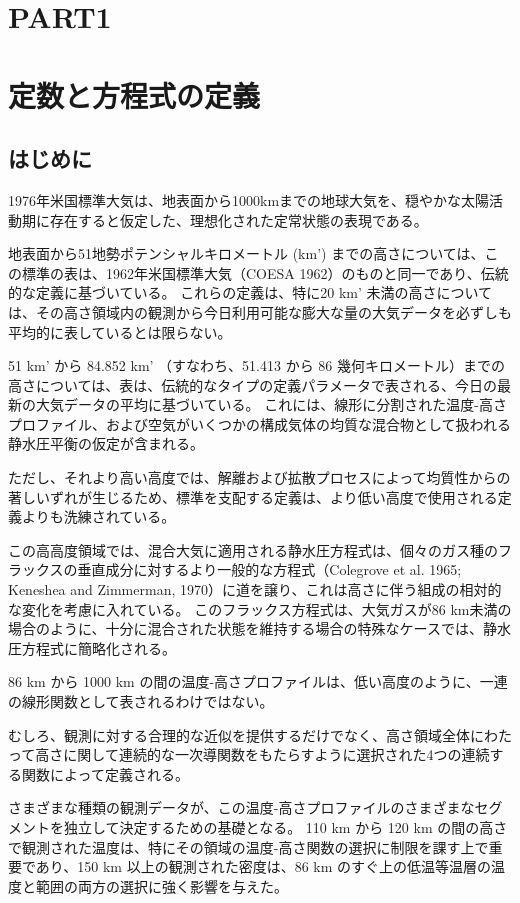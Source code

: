\documentclass{article}
\begin{document}
\begin{center}
  \section*{PART1}
  \section*{定数と方程式の定義}
\end{center}
\setcounter{section}{1}
\setcounter{subsection}{-1}
\subsection{はじめに}
1976年米国標準大気は、地表面から1000kmまでの地球大気を、穏やかな太陽活動期に存在すると仮定した、理想化された定常状態の表現である。

地表面から51地勢ポテンシャルキロメートル (km') までの高さについては、この標準の表は、1962年米国標準大気（COESA 1962）のものと同一であり、伝統的な定義に基づいている。
これらの定義は、特に20 km' 未満の高さについては、その高さ領域内の観測から今日利用可能な膨大な量の大気データを必ずしも平均的に表しているとは限らない。

51 km' から 84.852 km' （すなわち、51.413 から 86 幾何キロメートル）までの高さについては、表は、伝統的なタイプの定義パラメータで表される、今日の最新の大気データの平均に基づいている。
これには、線形に分割された温度-高さプロファイル、および空気がいくつかの構成気体の均質な混合物として扱われる静水圧平衡の仮定が含まれる。

ただし、それより高い高度では、解離および拡散プロセスによって均質性からの著しいずれが生じるため、標準を支配する定義は、より低い高度で使用される定義よりも洗練されている。

この高高度領域では、混合大気に適用される静水圧方程式は、個々のガス種のフラックスの垂直成分に対するより一般的な方程式（Colegrove et al. 1965; Keneshea and Zimmerman, 1970）に道を譲り、これは高さに伴う組成の相対的な変化を考慮に入れている。
このフラックス方程式は、大気ガスが86 km未満の場合のように、十分に混合された状態を維持する場合の特殊なケースでは、静水圧方程式に簡略化される。

86 km から 1000 km の間の温度-高さプロファイルは、低い高度のように、一連の線形関数として表されるわけではない。

むしろ、観測に対する合理的な近似を提供するだけでなく、高さ領域全体にわたって高さに関して連続的な一次導関数をもたらすように選択された4つの連続する関数によって定義される。

さまざまな種類の観測データが、この温度-高さプロファイルのさまざまなセグメントを独立して決定するための基礎となる。
110 km から 120 km の間の高さで観測された温度は、特にその領域の温度-高さ関数の選択に制限を課す上で重要であり、150 km 以上の観測された密度は、86 km のすぐ上の低温等温層の温度と範囲の両方の選択に強く影響を与えた。
\end{document}
